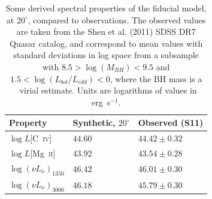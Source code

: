 \documentclass[useAMS,usenatbib]{mn2e_x}
\begin{document}
\begin{table}
\begin{tabular}{p{2cm}p{2cm}p{3cm}}
\hline Property & Synthetic, $20^\circ$ & Observed  (S11) \\ 
\hline \hline
$\log L$[C~\textsc{iv}]  & $44.60$ & $44.42 \pm 0.32$  \\
$\log L$[Mg~\textsc{ii}] & $43.92$ & $43.54 \pm 0.28$  \\
$\log (\nu L_{\nu})_{1350}$  & $46.42$ & $46.01 \pm 0.30$ \\
$\log (\nu L_{\nu})_{3000}$  & $46.18$ & $45.79 \pm 0.30$ \\
\hline
\end{tabular}
\caption{
Some derived spectral properties of the fiducial model, at $20^\circ$,
compared to observations. The observed values are taken from the Shen et al. (2011)
SDSS DR7 Quasar catalog, and correspond to mean values with standard deviations in log space
from a subsample with $8.5>\log(M_{BH})<9.5$ and $1.5<\log (L_{bol}/L_{edd}) < 0$,
where the BH mass is a \civ\ virial estimate. 
Units are logarithms of values in erg~s$^{-1}$.
}
\label{line_lums}
\end{table}
\end{document}
